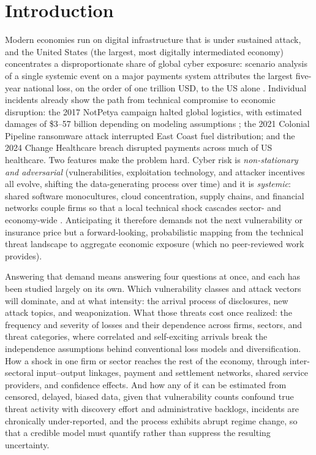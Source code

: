 \documentclass[review]{elsarticle}
\begin{document}
\section{Introduction}
\label{introduction}

Modern economies run on digital infrastructure that is under sustained attack, and the United States (the largest, most digitally intermediated economy) concentrates a disproportionate share of global cyber exposure: scenario analysis of a single systemic event on a major payments system attributes the largest five-year national loss, on the order of one trillion USD, to the US alone \citep{lloyds2023}. Individual incidents already show the path from technical compromise to economic disruption: the 2017 NotPetya campaign halted global logistics, with estimated damages of \$3--57 billion depending on modeling assumptions \citep{welburn2022}; the 2021 Colonial Pipeline ransomware attack interrupted East Coast fuel distribution; and the 2024 Change Healthcare breach disrupted payments across much of US healthcare. Two features make the problem hard. Cyber risk is \emph{non-stationary and adversarial} (vulnerabilities, exploitation technology, and attacker incentives all evolve, shifting the data-generating process over time) and it is \emph{systemic}: shared software monocultures, cloud concentration, supply chains, and financial networks couple firms so that a local technical shock cascades sector- and economy-wide \citep{esrb2020,eisenbach2022}. Anticipating it therefore demands not the next vulnerability or insurance price but a forward-looking, probabilistic mapping from the technical threat landscape to aggregate economic exposure (which no peer-reviewed work provides).

Answering that demand means answering four questions at once, and each has been studied largely on its own. Which vulnerability classes and attack vectors will dominate, and at what intensity: the arrival process of disclosures, new attack topics, and weaponization. What those threats cost once realized: the frequency and severity of losses and their dependence across firms, sectors, and threat categories, where correlated and self-exciting arrivals break the independence assumptions behind conventional loss models and diversification. How a shock in one firm or sector reaches the rest of the economy, through inter-sectoral input--output linkages, payment and settlement networks, shared service providers, and confidence effects. And how any of it can be estimated from censored, delayed, biased data, given that vulnerability counts confound true threat activity with discovery effort and administrative backlogs, incidents are chronically under-reported, and the process exhibits abrupt regime change, so that a credible model must quantify rather than suppress the resulting uncertainty.
\end{document}
